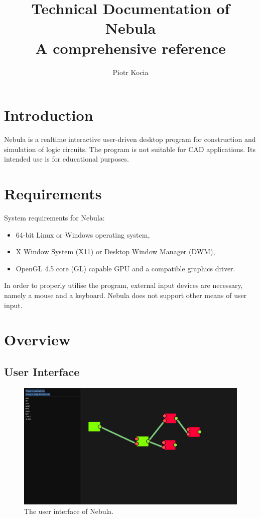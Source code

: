 \documentclass[12pt, a4paper]{article}
\title{Technical Documentation of Nebula \\
\large A comprehensive reference
}
\author{Piotr Kocia}
\date{}
\newenvironment{itemlist}
{
  \vspace{-0.5\topsep}
  \begin{itemize}
    \setlength{\itemsep}{4pt}
    \setlength{\parskip}{0pt}
} {
  \end{itemize}
  \vspace{-0.5\topsep}
}
\begin{document}
\maketitle

\tableofcontents

\section{Introduction}
Nebula is a realtime interactive user-driven desktop program for construction
and simulation of logic circuits. The program is not suitable for CAD
applications. Its intended use is for educational purposes.

\section{Requirements}
System requirements for Nebula:
\begin{itemlist}
  \item 64-bit Linux or Windows operating system,
  \item X Window System (X11) or Desktop Window Manager (DWM),
  \item OpenGL 4.5 core (GL) capable GPU and a compatible graphics driver.
\end{itemlist}
In order to properly utilise the program, external input devices are necessary,
namely a mouse and a keyboard. Nebula does not support other means of user
input.

\section{Overview}

\subsection{User Interface}
\begin{figure}
\includegraphics[width=\linewidth]{user_interface.png}
\caption{The user interface of Nebula.}
\end{figure}
\end{document}
